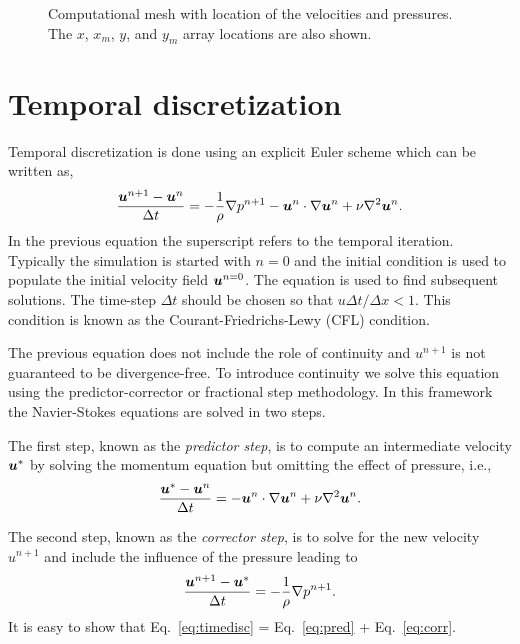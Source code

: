 \documentclass[]{article}
\newcommand{\ie}{i.e.}
\def\bm#1{\mbox{\boldmath{$#1$}}}
\begin{document}
\begin{figure}[htbp]
\begin{tikzpicture}[scale=2]



  \end{tikzpicture}
  \caption{Computational mesh with location of the velocities and pressures.  The $x$, $x_m$, $y$, and $y_m$ array locations are also shown.}
  \label{fig:mesh}
\end{figure}

\clearpage
\section{Temporal discretization}
Temporal discretization is done using an explicit Euler scheme which can be written as,
\begin{equation}\label{eq:timedisc}
  \frac{\bm{u}^{n+1}-\bm{u}^n}{\Delta t} = -\frac{1}{\rho}\nabla p^{n+1} -\bm{u}^n\cdot\nabla\bm{u}^n + \nu\nabla^2\bm{u}^n.
\end{equation}
In the previous equation the superscript refers to the temporal iteration.  Typically the simulation is started with $n=0$ and the initial condition is used to populate the initial velocity field $\bm{u}^{n=0}$.  The equation is used to find subsequent solutions.  The time-step $\Delta t$ should be chosen so that $u \Delta t/\Delta x < 1$.  This condition is known as the Courant-Friedrichs-Lewy (CFL) condition.

The previous equation does not include the role of continuity and $u^{n+1}$ is not guaranteed to be divergence-free.  To introduce continuity we solve this equation using the predictor-corrector or fractional step methodology.  In this framework the Navier-Stokes equations are solved in two steps.  

The first step, known as the \emph{predictor step}, is to compute an intermediate velocity $\bm{u}^*$ by solving the momentum equation but omitting the effect of pressure, \ie,
\begin{equation}\label{eq:pred}
  \frac{\bm{u}^*-\bm{u}^n}{\Delta t} = -\bm{u}^n\cdot\nabla\bm{u}^n + \nu\nabla^2\bm{u}^n.
\end{equation}

The second step, known as the \emph{corrector step}, is to solve for the new velocity $u^{n+1}$ and include the influence of the pressure leading to
\begin{equation}\label{eq:corr}
  \frac{\bm{u}^{n+1}-\bm{u}^*}{\Delta t}=-\frac{1}{\rho}\nabla p^{n+1}.
\end{equation}
It is easy to show that Eq.~\ref{eq:timedisc} = Eq.~\ref{eq:pred} + Eq.~\ref{eq:corr}.
\end{document}
